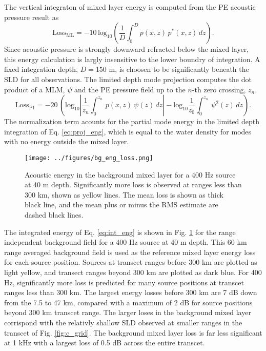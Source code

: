 \documentclass[preprint,NumberedRefs]{JASA}
\begin{document}
The vertical integraton of mixed layer energy is computed from the PE acoustic pressure result as
\begin{equation}
    \textrm{Loss}_{\textrm{ML}} = -10 \, \textrm{log}_{10} \left( \frac{1}{D} \int^{D}_0 p(x, z) \, p^* (x, z) \,  dz \right).
    \label{eq:int_eng}
\end{equation}
Since acoustic pressure is strongly downward refracted below the mixed layer, this energy calculation is largly insensitive to the lower boundry of integration. A fixed integration depth, $D=$150 m, is choosen to be significantly beneath the SLD for all observations. The limited depth mode projection computes the dot product of a MLM, $\psi$ and the PE pressure field up to the $n$-th zero crossing, $z_n$,
\begin{equation}
    \textrm{Loss}_{\textrm{P1}} = -20 \, \left( \textrm{log}_{10} \left| \frac{1}{z_n} \int^{z_n}_0 \, p(x, z) \ \psi(z) \,  dz \right| - \textrm{log}_{10} \frac{1}{z_0} \int^{z_n}_0 \, \psi^2(z) \,  dz \right).
    \label{eq:proj_eng}
\end{equation}
The normalization term acounts for the partial mode energy in the limited depth integration of Eq. \eqref{eq:proj_eng}, which is equal to the water density for modes with no energy outside the mixed layer\citep{jensen2011computational}.

\begin{figure}
\texttt{[image: ../figures/bg\_eng\_loss.png]}
    \caption{Acoustic energy in the background mixed layer for a 400 Hz source at 40 m depth. Significantly more loss is observed at ranges less than 300 km, shown as yellow lines. The mean loss is shown as thick black line, and the mean plus or minus the RMS estimate are dashed black lines.}
    \label{fig:bg_eng}
\end{figure}
The integrated energy of Eq. \eqref{eq:int_eng} is shown in Fig. \ref{fig:bg_eng} for the range independent background field for a 400 Hz source at 40 m depth. This 60 km range averaged background field is used as the reference mixed layer energy loss for each source position. Sources at transcet ranges before 300 km are plotted as light yellow, and transect ranges beyond 300 km are plotted as dark blue. For 400 Hz, significantly more loss is predicted for many source positions at transcet ranges less than 300 km. The largest energy losses before 300 km are 7 dB down from the 7.5 to 47 km, compared with a maximum of 2 dB for source positions beyond 300 km transcet range. The larger loses in the background mixed layer corrispond with the relativly shallow SLD observed at smaller ranges in the transcet of Fig. \ref{fig:c_grid}. The background mixed layer loss is far less significant at 1 kHz with a largest loss of 0.5 dB across the entire transcet.
\end{document}
